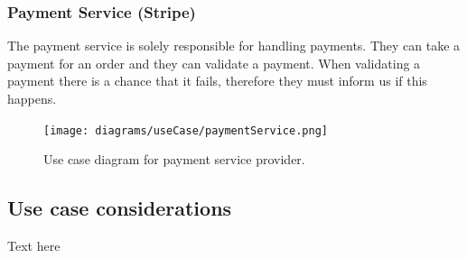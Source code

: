     \subsubsection{Payment Service (Stripe)}
      The payment service is solely responsible for handling payments. They can take a payment for an order and they can
      validate a payment. When validating a payment there is a chance that it fails, therefore they must inform us if this
      happens.
      \begin{figure}[H]
        \centering
        \texttt{[image: diagrams/useCase/paymentService.png]}
        \caption{Use case diagram for payment service provider.}
        \label{fig:UCpayment}
      \end{figure}
  
  \subsection{Use case considerations}
      Text here
\newpage
